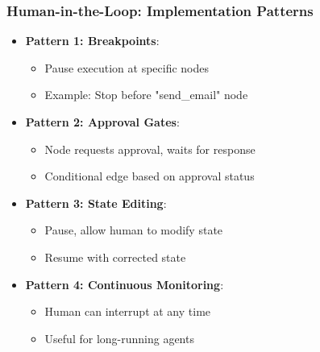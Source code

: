 \begin{frame}[fragile]\frametitle{Human-in-the-Loop: Implementation Patterns}
      \begin{itemize}
        \item \textbf{Pattern 1: Breakpoints}:
        \begin{itemize}
            \item Pause execution at specific nodes
            \item Example: Stop before "send\_email" node
        \end{itemize}
        \item \textbf{Pattern 2: Approval Gates}:
        \begin{itemize}
            \item Node requests approval, waits for response
            \item Conditional edge based on approval status
        \end{itemize}
        \item \textbf{Pattern 3: State Editing}:
        \begin{itemize}
            \item Pause, allow human to modify state
            \item Resume with corrected state
        \end{itemize}
        \item \textbf{Pattern 4: Continuous Monitoring}:
        \begin{itemize}
            \item Human can interrupt at any time
            \item Useful for long-running agents
        \end{itemize}
      \end{itemize}
\end{frame}

